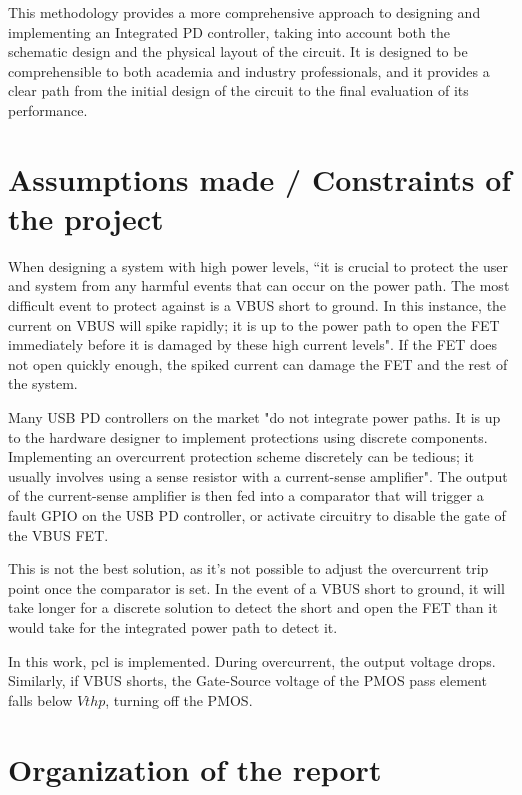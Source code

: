 This methodology provides a more comprehensive approach to designing and implementing an Integrated PD controller, taking into account both the schematic design and the physical layout of the circuit. It is designed to be comprehensible to both academia and industry professionals, and it provides a clear path from the initial design of the circuit to the final evaluation of its performance. 

\section[Assumptions made / Constraints of the project]{\textbf{Assumptions made / Constraints of the project}}

When designing a system with high power levels, “it is crucial to protect the user and system from any harmful events that can occur on the power path. The most difficult event to protect against is a VBUS short to ground. In this instance, the current on VBUS will spike rapidly; it is up to the power path to open the FET immediately before it is damaged by these high current levels"\cite{enos2022primer}. If the FET does not open quickly enough, the spiked current can damage the FET and the rest of the system.

Many USB PD controllers on the market "do not integrate power paths. It is up to the hardware designer to implement protections using discrete components. 
 Implementing an overcurrent protection scheme discretely can be tedious; it usually involves using a sense resistor with a current-sense amplifier"\cite{ti_linear_regulators}. The output of the current-sense amplifier is then fed into a comparator that will trigger a fault GPIO on the USB PD controller, or activate circuitry to disable the gate of the VBUS FET. 
 
This is not the best solution, as it’s not possible to adjust the overcurrent trip point once the comparator is set. In the event of a VBUS short to ground, it will take longer for a discrete solution to detect the short and open the FET than it would take for the integrated power path to detect it.

In this work, \gls{pcl} is implemented. During overcurrent, the output voltage drops. Similarly, if VBUS shorts, the Gate-Source voltage of the PMOS pass element falls below \(Vthp\), turning off the PMOS.

\section[Organization of the report]{\textbf{Organization of the report}}

